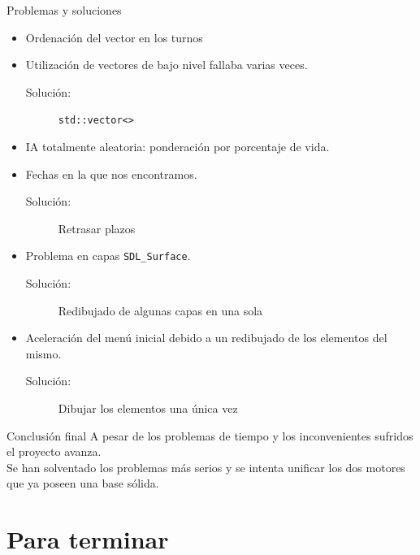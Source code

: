 \documentclass[9pt,xcolor=svgnames]{beamer}
\begin{document}
  \begin{frame}{Problemas y soluciones}
   \begin{itemize}
    \item Ordenación del vector en los turnos
    \item Utilización de vectores de bajo nivel fallaba varias
     veces.
	  \begin{description}
	   \item[Solución:] \texttt{std::vector<>}
	  \end{description}
    \item IA totalmente aleatoria: ponderación por porcentaje de vida.
    \item Fechas en la que nos encontramos.
	  \begin{description}
	   \item[Solución:] Retrasar plazos
	  \end{description}
    \item Problema en capas \texttt{SDL\_Surface}.
	  \begin{description}
	   \item[Solución:] Redibujado de algunas capas en una
		       sola
	  \end{description}
    \item Aceleración del menú inicial debido a un redibujado de los
	  elementos del mismo.	  
	  \begin{description}
	   \item[Solución:] Dibujar los elementos una única vez
	  \end{description}
   \end{itemize}

  
  \end{frame}

  \begin{frame}{Conclusión final}
   A pesar de los problemas de tiempo y los inconvenientes sufridos el
   proyecto avanza.\\

   Se han solventado los problemas más serios y se intenta unificar los
   dos motores que ya poseen una base sólida.
  \end{frame}
  
  
 \section{Para terminar}
  

  
\end{document}
